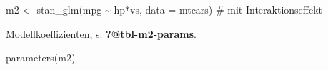 \documentclass[
  a4paper,
  DIV=11]{scrreprt}
\newenvironment{Shaded}{\begin{snugshade}}{\end{snugshade}}
\newcommand{\AttributeTok}[1]{\textcolor[rgb]{0.40,0.45,0.13}{#1}}
\newcommand{\CommentTok}[1]{\textcolor[rgb]{0.37,0.37,0.37}{#1}}
\newcommand{\FunctionTok}[1]{\textcolor[rgb]{0.28,0.35,0.67}{#1}}
\newcommand{\NormalTok}[1]{\textcolor[rgb]{0.00,0.23,0.31}{#1}}
\newcommand{\OtherTok}[1]{\textcolor[rgb]{0.00,0.23,0.31}{#1}}
\newcommand{\SpecialCharTok}[1]{\textcolor[rgb]{0.37,0.37,0.37}{#1}}
\theoremstyle{definition}
\theoremstyle{remark}
\begin{document}
\begin{Shaded}
\begin{Highlighting}[]
\NormalTok{m2 }\OtherTok{\textless{}{-}} \FunctionTok{stan\_glm}\NormalTok{(mpg }\SpecialCharTok{\textasciitilde{}}\NormalTok{ hp}\SpecialCharTok{*}\NormalTok{vs, }\AttributeTok{data =}\NormalTok{ mtcars)  }\CommentTok{\# mit Interaktionseffekt}
\end{Highlighting}
\end{Shaded}

Modellkoeffizienten, s. \textbf{?@tbl-m2-params}.

\begin{Shaded}
\begin{Highlighting}[]
\FunctionTok{parameters}\NormalTok{(m2)}
\end{Highlighting}
\end{Shaded}
\end{document}
